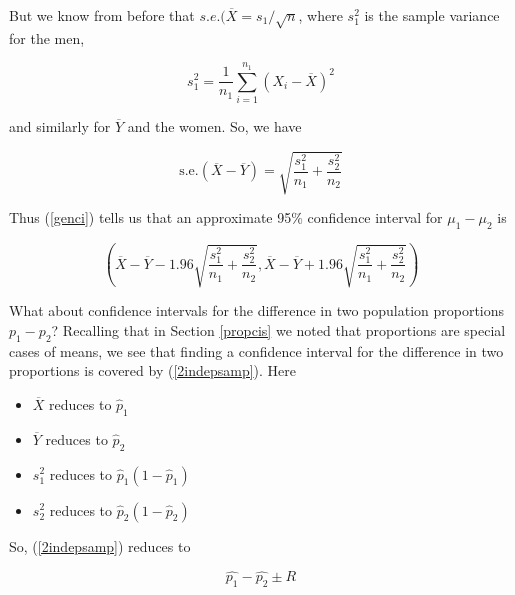 \label{diffxbarybar}

But we know from before that $s.e.(\overline{X} = s_1 / \sqrt{n}$, 
where $s^2_1$ is the sample variance for the men, 

\begin{equation}
s_1^2 = \frac{1}{n_1}\sum_{i=1}^{n_1} (X_i - \overline{X})^2
\end{equation}

and similarly for $\overline{Y}$ and the women.  So, 
we have

\begin{equation}
\label{sediff}
\textrm{s.e.}(\overline{X} - \overline{Y}) =
\sqrt{\frac{s_1^2}{n_1} + \frac{s_2^2}{n_2}}
\end{equation}

Thus (\ref{genci}) tells us that an approximate 95\% confidence interval
for $\mu_1 - \mu_2$ is

\begin{equation}
\label{2indepsamp}
\left (\overline{X}-\overline{Y} - 1.96 \sqrt{\frac{s_1^2}{n_1} + \frac{s_2^2}{n_2}},
\overline{X}-\overline{Y} + 1.96 \sqrt{\frac{s_1^2}{n_1} + \frac{s_2^2}{n_2}} \right )
\end{equation}


What about confidence intervals for the difference in two population
proportions $p_1 - p_2$?  Recalling that in Section \ref{propcis} we
noted that proportions are special cases of means, we see that finding a
confidence interval for the difference in two proportions is covered by
(\ref{2indepsamp}).  Here

\begin{itemize}

\item $\overline{X}$ reduces to $\widehat{p}_1$

\item $\overline{Y}$ reduces to $\widehat{p}_2$

\item $s_1^2$ reduces to $\widehat{p}_1 (1 - \widehat{p}_1)$ 

\item $s_2^2$ reduces to $\widehat{p}_2 (1 - \widehat{p}_2)$

\end{itemize}

So, (\ref{2indepsamp}) reduces to

\begin{equation}
\label{2indepprop}
\widehat{p_1} - \widehat{p_2}  \pm R
\end{equation}

